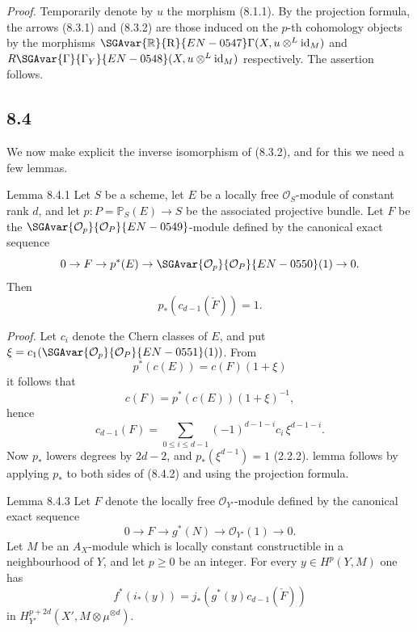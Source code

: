 \emph{Proof.} Temporarily denote by $u$ the morphism (8.1.1). By the projection formula, the arrows (8.3.1) and (8.3.2) are those induced on the $p$-th cohomology objects by the morphisms $\SGAvar{\mathbb{R}}{\mathrm{R}}{EN-0547}\Gamma(X,u\otimes^L\operatorname{id}_M)$ and $R\SGAvar{\Gamma}{\Gamma_Y}{EN-0548}(X,u\otimes^L\operatorname{id}_M)$ respectively. The assertion follows.

\subsection*{8.4}

We now make explicit the inverse isomorphism of (8.3.2), and for this we need a few lemmas.

\begin{statement}{Lemma 8.4.1}
Let $S$ be a scheme, let $E$ be a locally free $\mathcal O_S$-module of constant rank $d$, and let $p:P=\mathbb P_S(E)\to S$ be the associated projective bundle. Let $F$ be the $\SGAvar{\mathcal O_p}{\mathcal O_P}{EN-0549}$-module defined by the canonical exact sequence
\[
0\to F\to p^*(E)\to\SGAvar{\mathcal O_p}{\mathcal O_P}{EN-0550}(1)\to0.
\]
Then
\[
p_*(c_{d-1}(\check F))=1.
\]
\end{statement}

\emph{Proof.} Let $c_i$ denote the Chern classes of $E$, and put $\xi=c_1(\SGAvar{\mathcal O_p}{\mathcal O_P}{EN-0551}(1))$. From
\[
p^*(c(E))=c(F)(1+\xi)
\]
it follows that
\[
c(F)=p^*(c(E))(1+\xi)^{-1},
\]
hence
\[
c_{d-1}(F)=\sum_{0\le i\le d-1}(-1)^{d-1-i}c_i\,\xi^{d-1-i}.
\tag{8.4.2}
\]
Now $p_*$ lowers degrees by $2d-2$, and $p_*(\xi^{d-1})=1$ (2.2.2).  lemma follows by applying $p_*$ to both sides of (8.4.2) and using the projection formula.

\begin{statement}{Lemma 8.4.3}
Let $F$ denote the locally free $\mathcal O_{Y'}$-module defined by the canonical exact sequence
\[
0\to F\to g^*(N)\to\mathcal O_{Y'}(1)\to0.
\]
Let $M$ be an $A_X$-module which is locally constant constructible in a neighbourhood of $Y$, and let $p\ge0$ be an integer. For every $y\in H^p(Y,M)$ one has
\[
f^*(i_*(y))=j_*(g^*(y)c_{d-1}(\check F))
\]
in $H_{Y'}^{p+2d}(X',M\otimes\mu^{\otimes d})$.
\end{statement}

